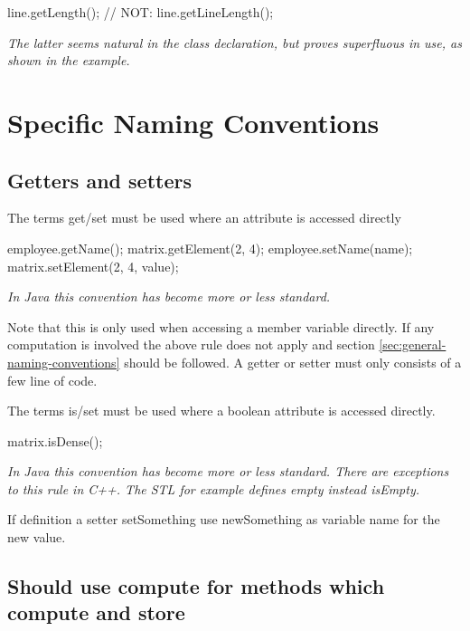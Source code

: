 \documentclass[a4paper,11pt,oneside]{scrbook}
\newcommand{\guideline}[1]{{\subsection{#1}}}
\newcommand{\motivation}[1]{{\normalfont \itshape #1}}
\newcommand{\trcode}[1]{{\normalfont \ttfamily #1}}
\begin{document}
\begin{code}
  line.getLength();  // NOT: line.getLineLength(); 
\end{code}

\motivation{ 
  The latter seems natural in the class declaration, but proves superfluous in
  use, as shown in the example.
}
  
\section{Specific Naming Conventions}

\guideline{Getters and setters}

The terms \trcode{get}/\trcode{set} must be used where an attribute is accessed
directly

\begin{code}
  employee.getName();
  matrix.getElement(2, 4);
  employee.setName(name);
  matrix.setElement(2, 4, value); 
\end{code}

\motivation{
  In Java this convention has become more or less standard.
}

Note that this is only used when accessing a member variable directly. If any
computation is involved the above rule does not apply and section
\ref{sec:general-naming-conventions} should be followed. A getter or setter must
only consists of a few line of code.

The terms \trcode{is}/\trcode{set} must be used where a boolean attribute is
accessed directly.

\begin{code}
  matrix.isDense();
\end{code}

\motivation{ 
  In Java this convention has become more or less standard. There are exceptions
  to this rule in C++. The STL for example defines \trcode{empty} instead
  \trcode{isEmpty}.
}

If definition a setter \trcode{setSomething} use \trcode{newSomething} as
variable name for the new value.

\guideline{Should use \trcode{compute} for methods which compute and store}
\end{document}
